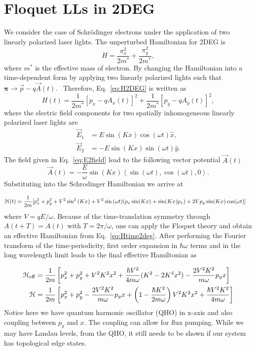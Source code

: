 \section{Floquet LLs in 2DEG}
We consider the case of Schr\"{o}dinger electrons under the application of two linearly polarized laser lights. The unperturbed Hamiltonian for 2DEG is%
\begin{equation}\label{eq:H2DEG}
H=\frac{\pi_{x}^{2}}{2m^{\ast}}+\frac{\pi_{y}^{2}}{2m^{\ast}},
\end{equation}
where $m^{\ast}$ is the effective mass of electron. By changing the Hamiltonian into a time-dependent form by applying two linearly polarized lights
such that $\bm{\pi}\rightarrow \vec{p}-q\vec{A}(t)$. \ Therefore, Eq.~\eqref{eq:H2DEG} is written as%
\begin{equation}\label{eq:H2time}
H(t)=\frac{1}{2m^{\ast}}[p_{x}-qA_{x}(t)]^{2}+\frac{1}{2m^{\ast}}[p_{y} -qA_{y}(t)]^{2},
\end{equation}
where the electric field components for two spatially inhomogeneous linearly polarized laser lights are
\begin{align} \label{eq:E2field}
  \vec{E}_{1} &= E\sin{(Kx)} \cos{(\omega t)}\hat{x}, \nonumber \\
  \vec{E}_{2} &= -E\sin{(Kx)} \sin{(\omega t)}\hat{y}.
\end{align}%
The field given in Eq.~\eqref{eq:E2field} lead to the following vector potential $\vec{A}(t)$
\begin{equation}\label{eq:Avec2deg}
  \vec{A}(t)= -\dfrac{E}{\omega} \sin{(Kx)} \left\langle \sin (\omega t), \cos{(\omega t)},0 \right\rangle.
\end{equation}%
Substituting into the Schrodinger Hamiltonian we arrive at

\begin{align}\label{eq:Htime2deg}
  \mathcal{H}(t) = \dfrac{1}{2m} [ &p_x^2 + p_y^2 + V^2 \sin^2{(Kx)} + V^2 \sin{(\omega t)} (p_x \sin(Kx) + \sin(Kx) p_x) + 2Vp_y \sin(Kx) \cos(\omega t) ]
\end{align}
where $V=qE/\omega$.
Because of the time-translation symmetry through $A(t+T) = A(t)$ with $T = 2\pi/\omega$, one can apply the Floquet theory \cite{AEE, MBL, supp} and obtain an effective Hamiltonian from Eq.~\eqref{eq:Htime2deg}. After performing the Fourier transform of the time-periodicity, first order expansion in $\hbar \omega$ terms and in the long wavelength limit leads to the final effective Hamiltonian as

\begin{align}\label{eq:Heff2deg}
  \mathcal{H}_{\rm eff} &= \dfrac{1}{2m} \left[ p_x^2 + p_y^2 + V^2K^2x^2 + \dfrac{\hbar V^2}{4m\omega} (K^2 - 2K^4x^2) - \dfrac{2V^2K^2}{m\omega} p_y x \right] \nonumber \\
  \mathcal{H} &= \dfrac{1}{2m} \left[ p_x^2 + p_y^2 - \dfrac{2V^2K^2}{m\omega} p_y x + \left(1-\dfrac{\hbar K^2}{2m\omega}\right)V^2K^2x^2 + \dfrac{\hbar V^2 K^2}{4m\omega} \right]
\end{align}
Notice here we have quantum harmonic oscillator (QHO) in x-axis and also coupling between $p_y$ and $x$.
The coupling can allow for flux pumping.
While we may have Landau levels, from the QHO, it still needs to be shown if our system has topological edge states.

